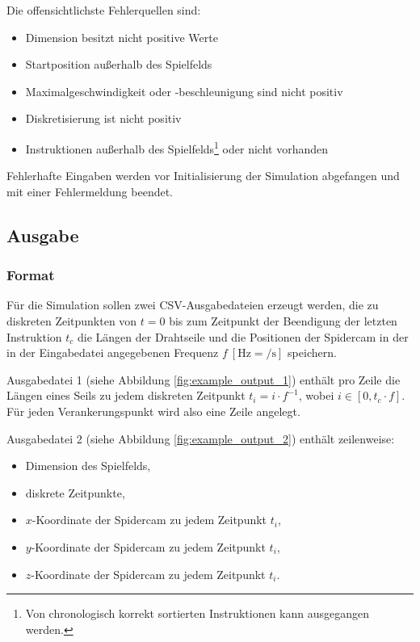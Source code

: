 Die offensichtlichste Fehlerquellen sind:

\begin{itemize}
    \item Dimension besitzt nicht positive Werte
    \item Startposition außerhalb des Spielfelds
    \item Maximalgeschwindigkeit oder -beschleunigung sind nicht positiv
    \item Diskretisierung ist nicht positiv
    \item Instruktionen außerhalb des Spielfelds\footnote{Von chronologisch korrekt sortierten Instruktionen kann ausgegangen werden.} oder nicht vorhanden
\end{itemize}

Fehlerhafte Eingaben werden vor Initialisierung der Simulation abgefangen und mit einer Fehlermeldung beendet.


\subsection{Ausgabe}
\label{ssec:ausgabe}


\subsubsection{Format}
\label{sssec:format}

Für die Simulation sollen zwei CSV-Ausgabedateien erzeugt werden, die zu diskreten Zeitpunkten von $t = 0$ bis zum Zeitpunkt der Beendigung der letzten Instruktion $t_c$ die Längen der Drahtseile und die Positionen der Spidercam in der in der Eingabedatei angegebenen Frequenz $f \ [\si{\hertz} = \si{\per\second}]$ speichern.

Ausgabedatei 1 (siehe Abbildung \ref{fig:example_output_1}) enthält pro Zeile die Längen eines Seils zu jedem diskreten Zeitpunkt $t_i = i \cdot f^{-1}$, wobei $i \in [0, t_c \cdot f]$.
Für jeden Verankerungspunkt wird also eine Zeile angelegt.

Ausgabedatei 2 (siehe Abbildung \ref{fig:example_output_2}) enthält zeilenweise:
\begin{itemize}
    \item Dimension des Spielfelds,
    \item diskrete Zeitpunkte,
    \item $x$-Koordinate der Spidercam zu jedem Zeitpunkt $t_i$,
    \item $y$-Koordinate der Spidercam zu jedem Zeitpunkt $t_i$,
    \item $z$-Koordinate der Spidercam zu jedem Zeitpunkt $t_i$.
\end{itemize}

